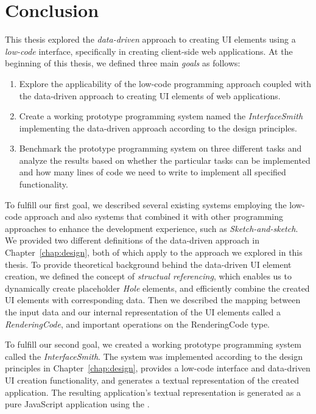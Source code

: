 \chapter*{Conclusion}

This thesis explored the \emph{data-driven} approach to creating UI elements using a \emph{low-code} interface, specifically in creating client-side web applications.
At the beginning of this thesis, we defined three main \emph{goals} as follows:
\begin{enumerate}
	\item Explore the applicability of the low-code programming approach coupled with the data-driven approach to creating UI elements of web applications.
	\item Create a working prototype programming system named the \emph{InterfaceSmith} implementing the data-driven approach according to the design principles.
	\item Benchmark the prototype programming system on three different tasks and analyze the results based on whether the particular tasks can be implemented and how many lines of code we need to write to implement all specified functionality.
\end{enumerate}

\noindent To fulfill our first goal, we described several existing systems employing the low-code approach and also systems that combined it with other programming approaches to enhance the development experience, such as \emph{Sketch-and-sketch}\cite{sketch-and-sketch}.
We provided two different definitions of the data-driven approach in Chapter~\ref{chap:design}, both of which apply to the approach we explored in this thesis.
To provide theoretical background behind the data-driven UI element creation, we defined the concept of \emph{structual referencing}, which enables us to dynamically create placeholder \emph{Hole} elements, and efficiently combine the created UI elements with corresponding data.
Then we described the mapping between the input data and our internal representation of the UI elements called a \emph{RenderingCode}, and important operations on the RenderingCode type.

To fulfill our second goal, we created a working prototype programming system called the \emph{InterfaceSmith}.
The system was implemented according to the design principles in Chapter~\ref{chap:design}, provides a low-code interface and data-driven UI creation functionality, and generates a textual representation of the created application.
The resulting application's textual representation is generated as a pure JavaScript application using the \citet{elm-arch}.

